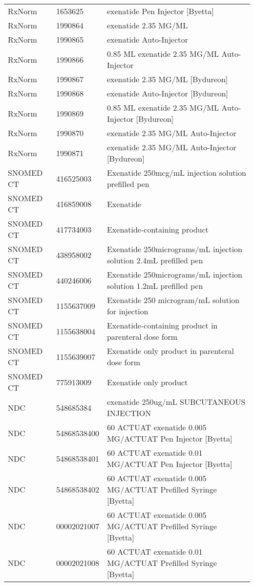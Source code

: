 \begin{longtable}{p{}p{}p{}}
  RxNorm & 1653625 & exenatide Pen Injector [Byetta] \\ 
  RxNorm & 1990864 & exenatide 2.35 MG/ML \\ 
  RxNorm & 1990865 & exenatide Auto-Injector \\ 
  RxNorm & 1990866 & 0.85 ML exenatide 2.35 MG/ML Auto-Injector \\ 
  RxNorm & 1990867 & exenatide 2.35 MG/ML [Bydureon] \\ 
  RxNorm & 1990868 & exenatide Auto-Injector [Bydureon] \\ 
  RxNorm & 1990869 & 0.85 ML exenatide 2.35 MG/ML Auto-Injector [Bydureon] \\ 
  RxNorm & 1990870 & exenatide 2.35 MG/ML Auto-Injector \\ 
  RxNorm & 1990871 & exenatide 2.35 MG/ML Auto-Injector [Bydureon] \\ 
  SNOMED CT & 416525003 & Exenatide 250mcg/mL injection solution prefilled pen \\ 
  SNOMED CT & 416859008 & Exenatide \\ 
  SNOMED CT & 417734003 & Exenatide-containing product \\ 
  SNOMED CT & 438958002 & Exenatide 250micrograms/mL injection solution 2.4mL prefilled pen \\ 
  SNOMED CT & 440246006 & Exenatide 250micrograms/mL injection solution 1.2mL prefilled pen \\ 
  SNOMED CT & 1155637009 & Exenatide 250 microgram/mL solution for injection \\ 
  SNOMED CT & 1155638004 & Exenatide-containing product in parenteral dose form \\ 
  SNOMED CT & 1155639007 & Exenatide only product in parenteral dose form \\ 
  SNOMED CT & 775913009 & Exenatide only product \\ 
  NDC & 548685384 & exenatide 250ug/mL SUBCUTANEOUS INJECTION \\ 
  NDC & 54868538400 & 60 ACTUAT exenatide 0.005 MG/ACTUAT Pen Injector [Byetta] \\ 
  NDC & 54868538401 & 60 ACTUAT exenatide 0.01 MG/ACTUAT Pen Injector [Byetta] \\ 
  NDC & 54868538402 & 60 ACTUAT exenatide 0.005 MG/ACTUAT Prefilled Syringe [Byetta] \\ 
  NDC & 00002021007 & 60 ACTUAT exenatide 0.005 MG/ACTUAT Prefilled Syringe [Byetta] \\ 
  NDC & 00002021008 & 60 ACTUAT exenatide 0.01 MG/ACTUAT Prefilled Syringe [Byetta] \\ 

\end{longtable}
